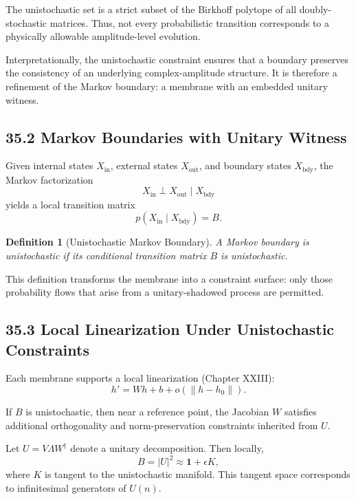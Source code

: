 \documentclass[12pt,letterpaper]{article}
\newtheorem{definition}[theorem]{Definition}
\theoremstyle{remark}
\begin{document}
The unistochastic set is a strict subset of the Birkhoff polytope of all doubly-stochastic matrices. Thus, not every probabilistic transition corresponds to a physically allowable amplitude-level evolution.

Interpretationally, the unistochastic constraint ensures that a boundary preserves the consistency of an underlying complex-amplitude structure. It is therefore a refinement of the Markov boundary: a membrane with an embedded unitary witness.

\subsection{35.2 Markov Boundaries with Unitary Witness}

Given internal states $X_{\text{in}}$, external states $X_{\text{out}}$, and boundary states $X_{\text{bdy}}$, the Markov factorization
\[
X_{\text{in}} \perp X_{\text{out}} \mid X_{\text{bdy}}
\]
yields a local transition matrix  
\[
p(X_{\text{in}} \mid X_{\text{bdy}}) = B.
\]

\begin{definition}[Unistochastic Markov Boundary]
A Markov boundary is \emph{unistochastic} if its conditional transition matrix $B$ is unistochastic.
\end{definition}

This definition transforms the membrane into a constraint surface: only those probability flows that arise from a unitary-shadowed process are permitted.

\subsection{35.3 Local Linearization Under Unistochastic Constraints}

Each membrane supports a local linearization (Chapter XXIII):
\[
h' = W h + b + o(\|h - h_0\|).
\]

If $B$ is unistochastic, then near a reference point, the Jacobian $W$ satisfies additional orthogonality and norm-preservation constraints inherited from $U$.

Let $U = V \Lambda W^\dagger$ denote a unitary decomposition. Then locally,
\[
B = |U|^2 \approx \mathbf{1} + \epsilon K,
\]
where $K$ is tangent to the unistochastic manifold. This tangent space corresponds to infinitesimal generators of $U(n)$.
\end{document}
